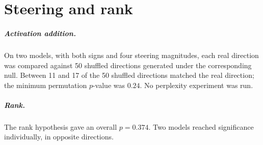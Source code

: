 \documentclass[11pt]{report}
\begin{document}
\chapter{Steering and rank}\label{app:steering}
\paragraph{Activation addition.} On two models, with both signs and four
steering magnitudes, each real direction was compared against 50 shuffled
directions generated under the corresponding null. Between 11 and 17 of the 50
shuffled directions matched the real direction; the minimum permutation
$p$-value was $0.24$. No perplexity experiment was run.

\paragraph{Rank.} The rank hypothesis \citep{engels2025not} gave an overall
$p = 0.374$. Two models reached significance individually, in opposite
directions.
\end{document}
